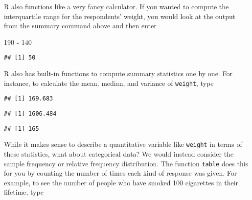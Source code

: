\documentclass[]{article}
\newenvironment{Shaded}{\begin{snugshade}}{\end{snugshade}}
\newcommand{\KeywordTok}[1]{\textcolor[rgb]{0.13,0.29,0.53}{\textbf{#1}}}
\newcommand{\DecValTok}[1]{\textcolor[rgb]{0.00,0.00,0.81}{#1}}
\newcommand{\StringTok}[1]{\textcolor[rgb]{0.31,0.60,0.02}{#1}}
\newcommand{\OperatorTok}[1]{\textcolor[rgb]{0.81,0.36,0.00}{\textbf{#1}}}
\newcommand{\NormalTok}[1]{#1}
\begin{document}
R also functions like a very fancy calculator. If you wanted to compute
the interquartile range for the respondents' weight, you would look at
the output from the summary command above and then enter

\begin{Shaded}
\begin{Highlighting}[]
\DecValTok{190} \OperatorTok{-}\StringTok{ }\DecValTok{140}
\end{Highlighting}
\end{Shaded}

\begin{verbatim}
## [1] 50
\end{verbatim}

R also has built-in functions to compute summary statistics one by one.
For instance, to calculate the mean, median, and variance of
\texttt{weight}, type

\begin{Shaded}
\end{Shaded}

\begin{verbatim}
## [1] 169.683
\end{verbatim}

\begin{Shaded}
\end{Shaded}

\begin{verbatim}
## [1] 1606.484
\end{verbatim}

\begin{Shaded}
\end{Shaded}

\begin{verbatim}
## [1] 165
\end{verbatim}

While it makes sense to describe a quantitative variable like
\texttt{weight} in terms of these statistics, what about categorical
data? We would instead consider the sample frequency or relative
frequency distribution. The function \texttt{table} does this for you by
counting the number of times each kind of response was given. For
example, to see the number of people who have smoked 100 cigarettes in
their lifetime, type
\end{document}
